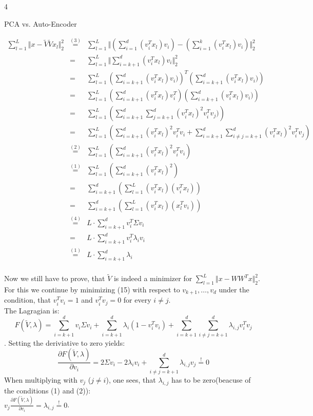 \documentclass{article}
\begin{document}
\begin{ukon-infie}[28.1.18]{4}
\begin{exercise}[p=20]{PCA vs. Auto-Encoder}
{			\begin{eqnarray}
			\sum_{l=1}^L \Vert x - \tilde{V}\tilde{V}x_l \Vert_2^2
			&\stackrel{(3)}{=}& \sum_{l=1}^L \Vert (\sum_{i=1}^d (v_i^T x_l)v_i) - (\sum_{i=1}^k (v_i^T x_l)v_i) \Vert_2^2 \\
			&=& \sum_{l=1}^L \Vert \sum_{i=k+1}^d (v_i^T x_l)v_i \Vert_2^2 \\
			&=& \sum_{l=1}^L \left(\sum_{i=k+1}^d (v_i^T x_l)v_i)\right)^T \left(\sum_{i=k+1}^d (v_i^T x_l)v_i)\right) \\
			&=& \sum_{l=1}^L \left(\sum_{i=k+1}^d (v_i^T x_l)v_i^T\right) \left(\sum_{i=k+1}^d (v_i^T x_l)v_i)\right) \\
			&=& \sum_{l=1}^L \left(\sum_{i=k+1}^d \sum_{j=k+1}^d (v_i^T x_l)^2v_i^Tv_j)\right) \\
			&=& \sum_{l=1}^L \left(\sum_{i=k+1}^d(v_i^T x_l)^2v_i^Tv_i + \sum_{i=k+1}^d \sum_{i\not=j=k+1}^d (v_i^T x_l)^2v_i^Tv_j\right) \\
			&\stackrel{(2)}{=}& \sum_{l=1}^L \left(\sum_{i=k+1}^d(v_i^T x_l)^2v_i^Tv_i \right) \\
			&\stackrel{(1)}{=}& \sum_{l=1}^L \left(\sum_{i=k+1}^d(v_i^T x_l)^2 \right) \\
			&=& \sum_{i=k+1}^d\left(\sum_{l=1}^L(v_i^T x_l)(v_i^T x_l) \right) \\
			&=& \sum_{i=k+1}^d\left(\sum_{l=1}^L(v_i^T x_l)(x_l^Tv_i) \right) \\
			&\stackrel{(4)}{=}& L \cdot \sum_{i=k+1}^dv_i^T \Sigma v_i\\
			&=& L \cdot \sum_{i=k+1}^dv_i^T \lambda_i v_i\\
			&\stackrel{(1)}{=}& L \cdot \sum_{i=k+1}^d\lambda_i\\
			\end{eqnarray}						
			
			Now we still have to prove, that $\tilde{V}$ is indeed a minimizer for $ \sum_{l=1}^L \Vert x - WW^Tx\Vert_2^2$.\\
			For this we continue by minimizing (15)	with respect to $v_{k+1}, \dots , v_{d}$ under the condition, that $v_i^Tv_i = 1$ and $v_i^Tv_j = 0$ for every $i \not = j$.\\
			
			The Lagragian is:\\
			$$F(\tilde{V}, \lambda) = \sum_{i=k+1}^dv_i \Sigma v_i + \sum_{i=k+1}^d \lambda_i (1- v_i^Tv_i) + \sum_{i=k+1}^d \sum_{i\not=j=k+1}^d \lambda_{i,j}v_i^Tv_j$$.
			Setting the deriviative to zero yields:\\
			$$ \frac{\partial F(\tilde{V}, \lambda)}{\partial v_i} = 2 \Sigma v_i - 2 \lambda_i v_i + \sum_{i\not=j=k+1}^d \lambda_{i,j}v_j \stackrel{!}{=}0$$
			When multiplying with $v_j$ ($j \not=i$), one sees, that $\lambda_{i,j}$ has to be zero(beacuse of the conditions (1) and (2)):\\
			$v_j \frac{\partial F(\tilde{V}, \lambda)}{\partial v_i} = \lambda_{i,j} \stackrel{!}{=}0$.\\
			
}
\end{exercise}
\end{ukon-infie}
\end{document}
